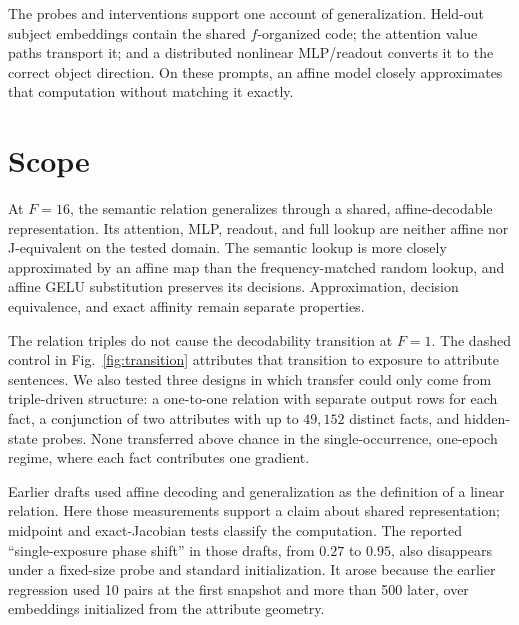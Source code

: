 \documentclass[11pt]{article}
\begin{document}
The probes and interventions support one account of generalization.  Held-out
subject embeddings contain the shared $f$-organized code; the attention value
paths transport it; and a distributed nonlinear MLP/readout converts it to the
correct object direction.  On these prompts, an affine model closely approximates
that computation without matching it exactly.

\section{Scope}

At $F{=}16$, the semantic relation generalizes through a shared,
affine-decodable representation.  Its attention, MLP, readout, and full lookup are
neither affine nor J-equivalent on the tested domain.  The semantic lookup is more
closely approximated by an affine map than the frequency-matched random lookup,
and affine GELU substitution preserves its decisions.  Approximation, decision
equivalence, and exact affinity remain separate properties.

The relation triples do not cause the decodability transition at $F{=}1$.  The
dashed control in Fig.~\ref{fig:transition} attributes that transition to exposure
to attribute sentences.  We also tested three designs in which transfer could only
come from triple-driven structure: a one-to-one relation with separate output rows
for each fact, a conjunction of two attributes with up to $49{,}152$ distinct
facts, and hidden-state probes.  None transferred above chance in the
single-occurrence, one-epoch regime, where each fact contributes one gradient.

Earlier drafts used affine decoding and generalization as the definition of a
linear relation.  Here those measurements support a claim about shared
representation; midpoint and exact-Jacobian tests classify the computation.  The
reported ``single-exposure phase shift'' in those drafts, from $0.27$ to $0.95$,
also disappears under a fixed-size probe and standard initialization.  It arose
because the earlier regression used 10 pairs at the first snapshot and more than
500 later, over embeddings initialized from the attribute geometry.
\end{document}
